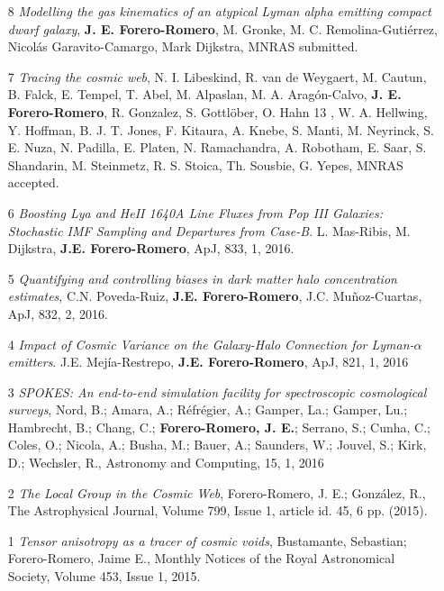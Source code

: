 \documentclass{article}
\begin{document}
\begin{itemize}

\item[8]{\it Modelling the gas kinematics of an atypical Lyman alpha
emitting compact dwarf galaxy}, {\bf J. E. Forero-Romero}, M. Gronke, M. C. Remolina-Guti\'errez,
Nicol\'as Garavito-Camargo, Mark Dijkstra, MNRAS submitted. 

\item[7]{\it Tracing the cosmic web}, N. I. Libeskind, R. van de Weygaert, M. Cautun, B. Falck, E.
Tempel, T. Abel, M. Alpaslan, M. A. Aragón-Calvo, {\bf
  J. E. Forero-Romero},  R. Gonzalez, S. Gottl\"ober, O. Hahn 13 ,
W. A. Hellwing, Y. Hoffman, B. J. T. Jones, F. Kitaura, A. Knebe,
S. Manti, M. Neyrinck, S. E. Nuza, N. Padilla, E. Platen,
N. Ramachandra, A. Robotham, E. Saar, S. Shandarin, M. Steinmetz,
R. S. Stoica, Th. Sousbie, G. Yepes, MNRAS accepted.  

\item[6]{\it Boosting Lya and HeII 1640A Line Fluxes from Pop III
  Galaxies: Stochastic IMF Sampling and Departures from
  Case-B}. L. Mas-Ribis, M. Dijkstra, {\bf J.E. Forero-Romero},
  ApJ, 833, 1, 2016.

\item[5]{\it Quantifying and controlling biases in dark matter halo
  concentration estimates}, C.N. Poveda-Ruiz, {\bf
  J.E. Forero-Romero}, J.C. Mu\~noz-Cuartas, ApJ, 832, 2, 2016. 

\item[4]{\it Impact of Cosmic Variance on the Galaxy-Halo Connection
  for Lyman-$\alpha$ emitters}.  J.E. Mej\'ia-Restrepo, {\bf
  J.E. Forero-Romero}, ApJ, 821, 1, 2016

\item[3]{\it SPOKES: An end-to-end simulation facility for
  spectroscopic cosmological surveys}, 
	Nord, B.; Amara, A.; R\'efr\'egier, A.; Gamper, La.; Gamper, Lu.;
        Hambrecht, B.; Chang, C.; {\bf Forero-Romero, J. E.}; Serrano, S.;
        Cunha, C.; Coles, O.; Nicola, A.; Busha, M.; Bauer, A.;
        Saunders, W.; Jouvel, S.; Kirk, D.; Wechsler, R., Astronomy
        and Computing, 15, 1, 2016
\item[2]{\it The Local Group in the Cosmic Web}, 	
Forero-Romero, J. E.; González, R., The Astrophysical Journal, Volume
799, Issue 1, article id. 45, 6 pp. (2015). 
\item[1] {\it Tensor anisotropy as a tracer of cosmic voids}, 
Bustamante, Sebastian; Forero-Romero, Jaime E., Monthly Notices of the
Royal Astronomical Society, Volume 453, Issue 1, 2015.
\end{itemize}
\end{document}
